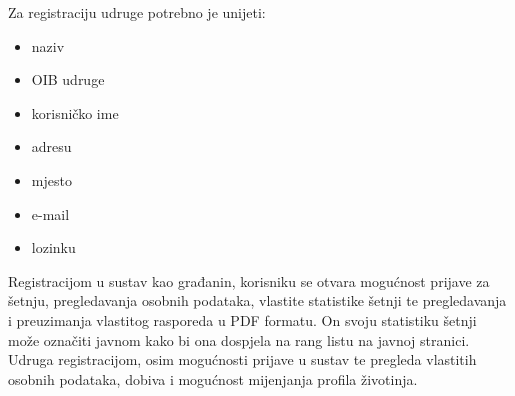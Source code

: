 		\noindent
		Za registraciju udruge potrebno je unijeti:
	
		\begin{itemize}
			\item naziv
			\item OIB udruge
			\item korisničko ime
			\item adresu
			\item mjesto
			\item e-mail
			\item lozinku
		\end{itemize}
		
		\noindent
		Registracijom u sustav kao građanin, korisniku se otvara mogućnost prijave za šetnju, pregledavanja osobnih podataka, vlastite statistike šetnji te pregledavanja i preuzimanja vlastitog rasporeda u PDF formatu. On svoju statistiku šetnji može označiti javnom kako bi ona dospjela na rang listu na javnoj stranici.
		\newline
		Udruga registracijom, osim mogućnosti prijave u sustav te pregleda vlastitih osobnih podataka, dobiva i mogućnost mijenjanja profila životinja.
		
		\eject
	
